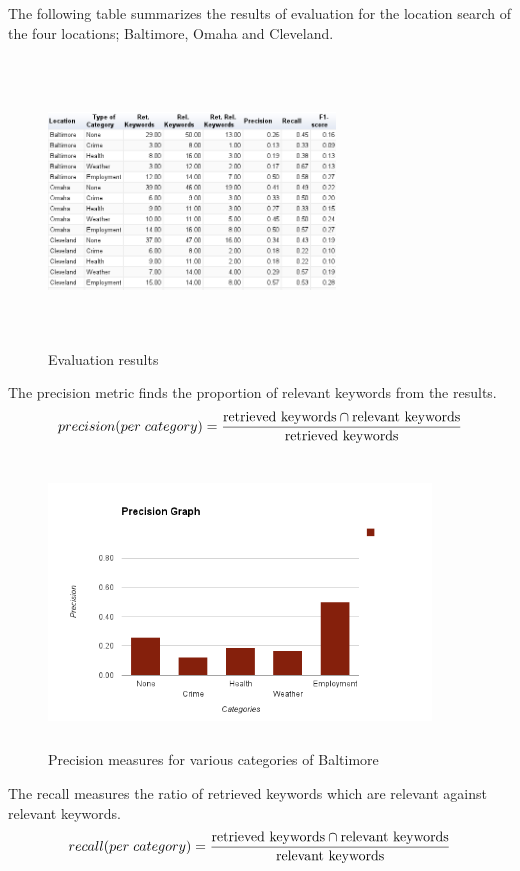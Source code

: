\documentclass[conference]{IEEEtran}
\begin{document}
The following table summarizes the results of evaluation for the location search of the four locations; Baltimore, Omaha and Cleveland.

\begin{figure}[h]
\includegraphics[height=3in, width=3in]{table_sample.png}
\caption{Evaluation results}
\label{table}
\end{figure}

The precision metric finds the proportion of relevant keywords from the results.
\begin{equation}
precision (per \hspace{1mm} category) = \frac{\text{retrieved keywords} \cap \text{relevant keywords}} {\text{retrieved keywords}}
\end{equation}

\begin{figure}[h]
\includegraphics[height=3in, width=4in]{precision.png}
\caption{Precision measures for various categories of Baltimore}
\label{precision}
\end{figure}

The recall measures the ratio of retrieved keywords which are relevant against relevant keywords.
\begin{equation}
recall (per \hspace{1mm} category) = \frac{\text{retrieved keywords} \cap \text{relevant keywords}} {\text{relevant keywords}}
\end{equation}
\end{document}
